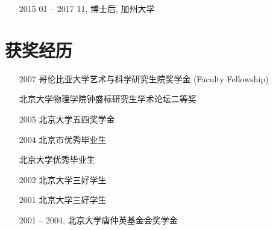 \documentclass[11pt]{article}
\newcommand{\richard}{\href{http://www.ldeo.columbia.edu/res/div/ocp/people/seager/}{Richard Seager}}
\newcommand{\cane}{\href{http://www.ldeo.columbia.edu/user/mcane}{Mark A. Cane}}
\newcommand{\gudrun}{\href{http://sites.uci.edu/magnusdottir}{Gudrun Magnusdottir}}
\begin{document}
\begin{CJK*}{UTF8}{gkai}
\begin{itemize}[leftmargin=10ex,label={},noitemsep,nolistsep]
	\item[2015] 01 -- 2017 11, 博士后, 加州大学
	\end{itemize}


\section{获奖经历}
\begin{itemize}[leftmargin=10ex,label={},noitemsep,nolistsep]
	\item[2007] 哥伦比亚大学艺术与科学研究生院奖学金 (Faculty Fellowship)
	
	\item[\phantom{2007}] 北京大学物理学院钟盛标研究生学术论坛二等奖 
	
	\item[2005] 北京大学五四奖学金	
	
	\item[2004] 北京市优秀毕业生
	
	\item[\phantom{2004}] 北京大学优秀毕业生
		
	\item[2002] 北京大学三好学生
	
	\item[2001] 北京大学三好学生
	
	\item[2001]-- 2004, 北京大学唐仲英基金会奖学金
		

\end{itemize}
\end{CJK*}
\end{document}
